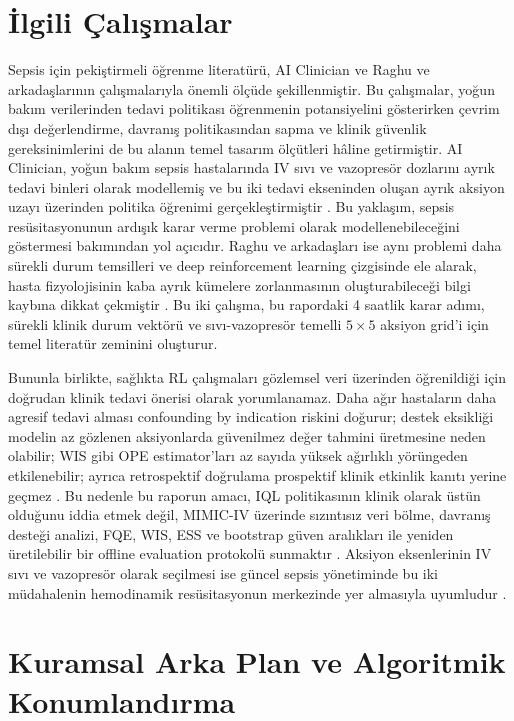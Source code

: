 \documentclass[conference]{IEEEtran}
\begin{document}
\section{İlgili Çalışmalar}
Sepsis için pekiştirmeli öğrenme literatürü, AI Clinician ve Raghu ve arkadaşlarının çalışmalarıyla önemli ölçüde şekillenmiştir. Bu çalışmalar, yoğun bakım verilerinden tedavi politikası öğrenmenin potansiyelini gösterirken çevrim dışı değerlendirme, davranış politikasından sapma ve klinik güvenlik gereksinimlerini de bu alanın temel tasarım ölçütleri hâline getirmiştir. AI Clinician, yoğun bakım sepsis hastalarında IV sıvı ve vazopresör dozlarını ayrık tedavi binleri olarak modellemiş ve bu iki tedavi ekseninden oluşan ayrık aksiyon uzayı üzerinden politika öğrenimi gerçekleştirmiştir \cite{komorowski2018ai}. Bu yaklaşım, sepsis resüsitasyonunun ardışık karar verme problemi olarak modellenebileceğini göstermesi bakımından yol açıcıdır. Raghu ve arkadaşları ise aynı problemi daha sürekli durum temsilleri ve deep reinforcement learning çizgisinde ele alarak, hasta fizyolojisinin kaba ayrık kümelere zorlanmasının oluşturabileceği bilgi kaybına dikkat çekmiştir \cite{raghu2017sepsis}. Bu iki çalışma, bu rapordaki 4 saatlik karar adımı, sürekli klinik durum vektörü ve sıvı-vazopresör temelli $5\times5$ aksiyon grid'i için temel literatür zeminini oluşturur.

Bununla birlikte, sağlıkta RL çalışmaları gözlemsel veri üzerinden öğrenildiği için doğrudan klinik tedavi önerisi olarak yorumlanamaz. Daha ağır hastaların daha agresif tedavi alması confounding by indication riskini doğurur; destek eksikliği modelin az gözlenen aksiyonlarda güvenilmez değer tahmini üretmesine neden olabilir; WIS gibi OPE estimator'ları az sayıda yüksek ağırlıklı yörüngeden etkilenebilir; ayrıca retrospektif doğrulama prospektif klinik etkinlik kanıtı yerine geçmez \cite{gottesman2019guidelines}. Bu nedenle bu raporun amacı, IQL politikasının klinik olarak üstün olduğunu iddia etmek değil, MIMIC-IV üzerinde sızıntısız veri bölme, davranış desteği analizi, FQE, WIS, ESS ve bootstrap güven aralıkları ile yeniden üretilebilir bir offline evaluation protokolü sunmaktır \cite{voloshin2021ope}. Aksiyon eksenlerinin IV sıvı ve vazopresör olarak seçilmesi ise güncel sepsis yönetiminde bu iki müdahalenin hemodinamik resüsitasyonun merkezinde yer almasıyla uyumludur \cite{evans2021ssc}.

\section{Kuramsal Arka Plan ve Algoritmik Konumlandırma}
\end{document}
